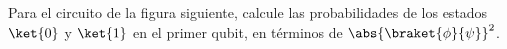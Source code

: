 \documentclass[./../main.tex]{subfiles}
\begin{document}

    \section{}

    Para el circuito de la figura siguiente, calcule las probabilidades de los estados \(\ket{0}\) y \(\ket{1}\) en el primer qubit, en términos de \(\abs{\braket{\phi}{\psi}}^{2}\).

    \begin{figure}[htb]
        \centering
        
        \label{fig:second-circuit}
    \end{figure}
\end{document}
